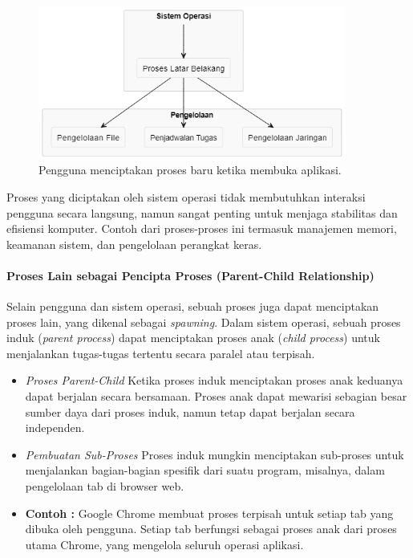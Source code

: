 \documentclass[12pt]{article}
\begin{document}
\begin{figure}[h]
    \centering
    \includegraphics[width=0.9\textwidth]{asset/os background process creation.png}
    \caption{Pengguna menciptakan proses baru ketika membuka aplikasi.}
\end{figure}

Proses yang diciptakan oleh sistem operasi tidak membutuhkan interaksi pengguna secara langsung, namun sangat penting untuk menjaga stabilitas dan efisiensi komputer. Contoh dari proses-proses ini termasuk manajemen memori, keamanan sistem, dan pengelolaan perangkat keras.

\paragraph{Proses Lain sebagai Pencipta Proses (Parent-Child Relationship)}

Selain pengguna dan sistem operasi, sebuah proses juga dapat menciptakan proses lain, yang dikenal sebagai \textit{spawning}. Dalam sistem operasi, sebuah proses induk (\textit{parent process}) dapat menciptakan proses anak (\textit{child process}) untuk menjalankan tugas-tugas tertentu secara paralel atau terpisah.

\begin{itemize}
    \item \textit{Proses Parent-Child} Ketika proses induk menciptakan proses anak keduanya dapat berjalan secara bersamaan. Proses anak dapat mewarisi sebagian besar sumber daya dari proses induk, namun tetap dapat berjalan secara independen.
    \item \textit{Pembuatan Sub-Proses} Proses induk mungkin menciptakan sub-proses untuk menjalankan bagian-bagian spesifik dari suatu program, misalnya, dalam pengelolaan tab di browser web.
    \item \textbf{Contoh :} Google Chrome membuat proses terpisah untuk setiap tab yang dibuka oleh pengguna. Setiap tab berfungsi sebagai proses anak dari proses utama Chrome, yang mengelola seluruh operasi aplikasi.
\end{itemize}
\end{document}
